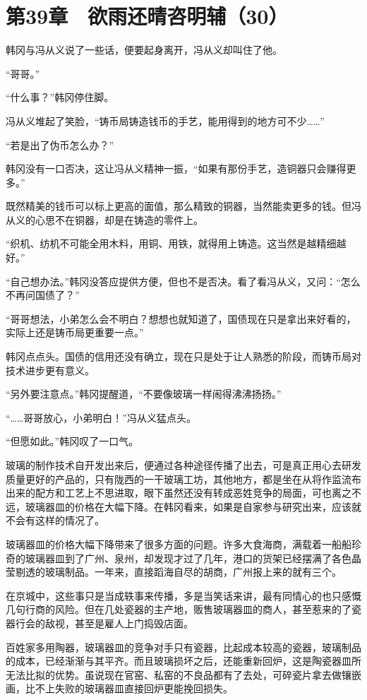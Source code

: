 \section{第39章　欲雨还晴咨明辅（30）}

 韩冈与冯从义说了一些话，便要起身离开，冯从义却叫住了他。

“哥哥。”

“什么事？”韩冈停住脚。

冯从义堆起了笑脸，“铸币局铸造钱币的手艺，能用得到的地方可不少……”

“若是出了伪币怎么办？”

韩冈没有一口否决，这让冯从义精神一振，“如果有那份手艺，造铜器只会赚得更多。”

既然精美的钱币可以标上更高的面值，那么精致的铜器，当然能卖更多的钱。但冯从义的心思不在铜器，却是在铸造的零件上。

“织机、纺机不可能全用木料，用铜、用铁，就得用上铸造。这当然是越精细越好。”

“自己想办法。”韩冈没答应提供方便，但也不是否决。看了看冯从义，又问：“怎么不再问国债了？”

“哥哥想法，小弟怎么会不明白？想想也就知道了，国债现在只是拿出来好看的，实际上还是铸币局更重要一点。”

韩冈点点头。国债的信用还没有确立，现在只是处于让人熟悉的阶段，而铸币局对技术进步更有意义。

“另外要注意点。”韩冈提醒道，“不要像玻璃一样闹得沸沸扬扬。”

“……哥哥放心，小弟明白！”冯从义猛点头。

“但愿如此。”韩冈叹了一口气。

玻璃的制作技术自开发出来后，便通过各种途径传播了出去，可是真正用心去研发质量更好的产品的，只有陇西的一干玻璃工坊，其他地方，都是坐在从将作监流布出来的配方和工艺上不思进取，眼下虽然还没有转成恶姓竞争的局面，可也离之不远，玻璃器皿的价格在大幅下降。在韩冈看来，如果是自家参与研究出来，应该就不会有这样的情况了。

玻璃器皿的价格大幅下降带来了很多方面的问题。许多大食海商，满载着一船船珍奇的玻璃器皿到了广州、泉州，却发现才过了几年，港口的货架已经摆满了各色晶莹剔透的玻璃制品。一年来，直接蹈海自尽的胡商，广州报上来的就有三个。

在京城中，这些事只是当成轶事来传播，多是当笑话来讲，最有同情心的也只感慨几句行商的风险。但在几处瓷器的主产地，贩售玻璃器皿的商人，甚至惹来的了瓷器行会的敌视，甚至是雇人上门捣毁店面。

百姓家多用陶器，玻璃器皿的竞争对手只有瓷器，比起成本较高的瓷器，玻璃制品的成本，已经渐渐与其平齐。而且玻璃损坏之后，还能重新回炉，这是陶瓷器皿所无法比拟的优势。虽说现在官窑、私窑的不良品都有了去处，可碎瓷片拿去做镶嵌画，比不上失败的玻璃器皿直接回炉更能挽回损失。

